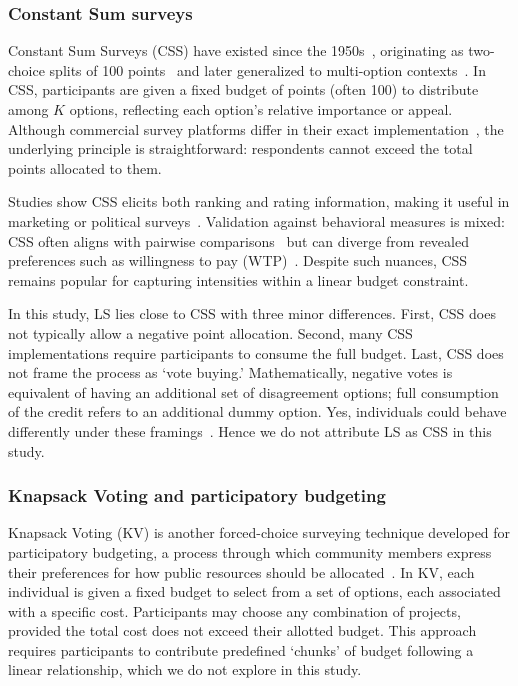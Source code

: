 \subsubsection{Constant Sum surveys}
Constant Sum Surveys (CSS) have existed since the 1950s~\cite{Malhotra_Naresh_K_2012, smithBasicMarketingResearch2013, Donald_R_Cooper2013-03-05}, originating as two-choice splits of 100 points~\cite{metfesselProposalQuantitativeReporting1947} and later generalized to multi-option contexts~\cite{zhuSelfestimationWeightParameter1991, harwoodUnderstandingImplicitExplicit2019}. In CSS, participants are given a fixed budget of points (often 100) to distribute among $K$ options, reflecting each option’s relative importance or appeal. Although commercial survey platforms differ in their exact implementation~\cite{qualtricsConstantSumQuestion2025,surveysparrowWhatConstantSum2025,lorraineConstantSumQuestion2022}, the underlying principle is straightforward: respondents cannot exceed the total points allocated to them.

Studies show CSS elicits both ranking and rating information, making it useful in marketing or political surveys~\cite{collewetPreferenceEstimationPoint2023}. Validation against behavioral measures is mixed: CSS often aligns with pairwise comparisons~\cite{dudekValidityPointAssignmentProcedure1957} but can diverge from revealed preferences such as willingness to pay (WTP)~\cite{louviereComparisonImportanceWeights2008}. Despite such nuances, CSS remains popular for capturing intensities within a linear budget constraint.

In this study, LS lies close to CSS with three minor differences. First, CSS does not typically allow a negative point allocation. Second, many CSS implementations require participants to consume the full budget. Last, CSS does not frame the process as `vote buying.'  Mathematically, negative votes is equivalent of having an additional set of disagreement options; full consumption of the credit refers to an additional dummy option. Yes, individuals could behave differently under these framings~\cite{shahScarcityFramesValue2015, kahnemanProspectTheoryAnalysis1979}. Hence we do not attribute LS as CSS in this study.

\subsubsection{Knapsack Voting and participatory budgeting}
Knapsack Voting (KV) is another forced-choice surveying technique developed for participatory budgeting, a process through which community members express their preferences for how public resources should be allocated~\cite{goelKnapsackVotingParticipatory2019, goel2016budget}. In KV, each individual is given a fixed budget to select from a set of options, each associated with a specific cost. Participants may choose any combination of projects, provided the total cost does not exceed their allotted budget. This approach requires participants to contribute predefined `chunks' of budget following a linear relationship, which we do not explore in this study.

